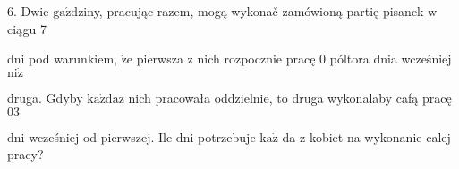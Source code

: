\documentclass[a4paper,12pt]{article}
\begin{document}
6. Dwie $\mathrm{g}\mathrm{a}\acute{\mathrm{z}}$dziny, pracując razem, mogą wykonač zamówioną partię pisanek $\mathrm{w}$ ciągu 7

dni pod warunkiem, $\dot{\mathrm{z}}\mathrm{e}$ pierwsza $\mathrm{z}$ nich rozpocznie pracę $0$ póltora dnia wcześniej $\mathrm{n}\mathrm{i}\dot{\mathrm{z}}$

druga. Gdyby $\mathrm{k}\mathrm{a}\dot{\mathrm{z}}\mathrm{d}\mathrm{a}\mathrm{z}$ nich pracowała oddzielnie, to druga wykonalaby cafą pracę $03$

$\mathrm{d}\mathrm{n}\mathrm{i}$ wcześniej od pierwszej. Ile $\mathrm{d}\mathrm{n}\mathrm{i}$ potrzebuje $\mathrm{k}\mathrm{a}\dot{\mathrm{z}}$ da $\mathrm{z}$ kobiet na wykonanie calej pracy?
\end{document}
